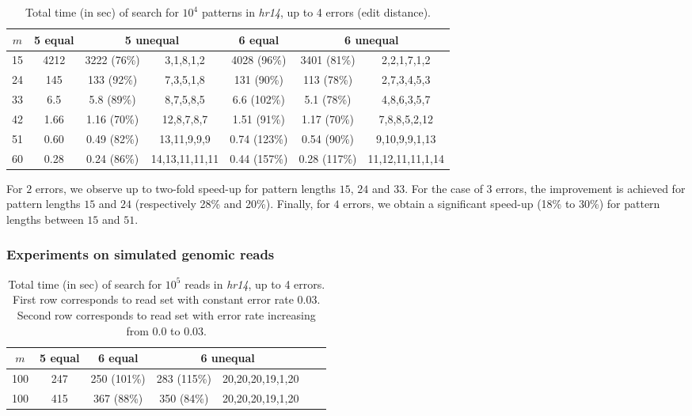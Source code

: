 \documentclass[12pt]{article}
\begin{document}
\begin{table}[!tb]
\caption{Total time (in sec) of search for $10^4$ patterns
in \emph{hr14}, up to 4 errors (edit distance).
\label{tab:times4edit}}
\centering
\begin{tabular}{|c|c|c|c|c|c|c|}
\hline
$m$ & 5 equal & \multicolumn{2}{|c|}{5 unequal} & 6 equal & \multicolumn{2}{|c|}{6 unequal} \\
\hline
15 & 4212 & 3222 (76\%)  & 3,1,8,1,2 & 4028 (96\%) & 3401 (81\%) & 2,2,1,7,1,2 \\
24 & 145 & 133 (92\%)  & 7,3,5,1,8 & 131 (90\%) & 113 (78\%) & 2,7,3,4,5,3 \\
33 & 6.5  & 5.8 (89\%)   & 8,7,5,8,5 & 6.6 (102\%)  & 5.1 (78\%) & 4,8,6,3,5,7 \\
42 & 1.66  & 1.16 (70\%)  & 12,8,7,8,7 & 1.51 (91\%)  & 1.17 (70\%) & 7,8,8,5,2,12 \\
51 & 0.60  & 0.49 (82\%)  & 13,11,9,9,9 & 0.74 (123\%)  & 0.54 (90\%) & 9,10,9,9,1,13 \\
60 & 0.28  & 0.24 (86\%)  & 14,13,11,11,11 & 0.44 (157\%)  & 0.28 (117\%) & 11,12,11,11,1,14 \\
\hline
\end{tabular}
\end{table}

For $2$ errors, we observe up to two-fold speed-up for pattern lengths
$15$, $24$ and $33$. For the case of $3$
errors, the improvement is achieved for pattern lengths $15$ and $24$
(respectively 28\% and 20\%). Finally, for $4$ errors, we obtain a significant speed-up (18\%
to 30\%) for pattern lengths between $15$ and $51$.




\subsubsection{Experiments on simulated 
genomic
  reads}\label{subsubsec:experimentgenomic}

\begin{table}[!tb]
\caption{Total time (in sec) 
of search for $10^5$ reads in \emph{hr14}, up to 4 errors.
First row corresponds to read set with constant error rate $0.03$.
Second row corresponds to read set with error rate increasing from $0.0$ to $0.03$.
\label{tab:expgenomic}}
\centering
\begin{tabular}{|c|c|c|c|c|c|c|}
\hline
$m$ & 5 equal & 6 equal & \multicolumn{2}{|c|}{6 unequal} \\
\hline
100 & 247  & 250 (101\%)  & 283 (115\%) & 20,20,20,19,1,20 \\
100 & 415  & 367 (88\%)  & 350 (84\%) & 20,20,20,19,1,20 \\
\hline
\end{tabular}
\end{table}
\end{document}
